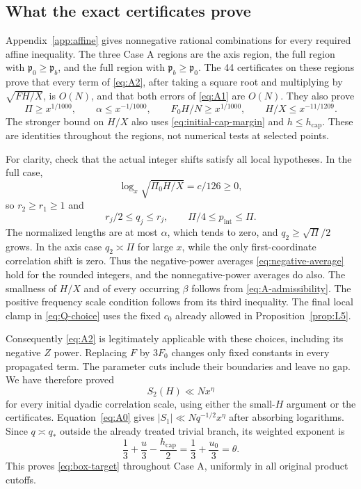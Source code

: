 \documentclass[11pt,a4paper]{article}
\numberwithin{equation}{section}
\theoremstyle{remark}
\newcommand{\pint}{p_{\mathrm{int}}}
\newcommand{\hcap}{h_{\mathrm{cap}}}
\newcommand{\Fzero}{F_0}
\begin{document}
\subsection{What the exact certificates prove}
Appendix~\ref{app:affine} gives nonnegative rational combinations for every
required affine inequality. The three Case A regions are the axis region,
the full region with $\mathfrak p_0\ge\mathfrak p_b$, and the full region
with $\mathfrak p_b\ge\mathfrak p_0$. The 44 certificates on these regions
prove that every term of \eqref{eq:A2}, after taking a square root and
multiplying by $\sqrt{FH/X}$, is $O(N)$, and that both errors of
\eqref{eq:A1} are $O(N)$. They also prove
\begin{equation}\label{eq:A-admissibility}
 \Pi\ge x^{1/1000},\qquad
 \alpha\le x^{-1/1000},\qquad
 \Fzero H/N\ge x^{1/1000},\qquad H/X\le x^{-11/1209}.
\end{equation}
The stronger bound on $H/X$ also uses \eqref{eq:initial-cap-margin}
and $h\le\hcap$. These are identities throughout the regions, not
numerical tests at selected points.

For clarity, check that the actual integer shifts satisfy all local
hypotheses. In the full case,
\[
 \log_x\sqrt{\Pi_0H/X}=c/126\ge0,
\]
so $r_2\ge r_1\ge1$ and
\begin{equation}\label{eq:integer-product}
 r_j/2\le q_j\le r_j,\qquad \Pi/4\le\pint\le\Pi.
\end{equation}
The normalized lengths are at most $\alpha$, which tends to zero, and
$q_2\ge\sqrt\Pi/2$ grows. In the axis case $q_2\asymp\Pi$ for large $x$,
while the only first-coordinate correlation shift is zero. Thus the
negative-power averages \eqref{eq:negative-average} hold for the rounded
integers, and the nonnegative-power averages do also. The smallness of
$H/X$ and of every occurring $\beta$ follows from
\eqref{eq:A-admissibility}. The positive frequency scale condition follows
from its third inequality. The final local clamp in \eqref{eq:Q-choice}
uses the fixed $c_0$ already allowed in Proposition~\ref{prop:L5}.

Consequently \eqref{eq:A2} is legitimately applicable with these choices,
including its negative $Z$ power. Replacing $F$ by $3\Fzero$ changes only
fixed constants in every propagated term. The parameter cuts include their
boundaries and leave no gap. We have therefore proved
\[
 S_2(H)\ll Nx^\eta
\]
for every initial dyadic correlation scale, using either the small-$H$
argument or the certificates. Equation~\eqref{eq:A0} gives
$|S_1|\ll Nq^{-1/2}x^\eta$ after absorbing logarithms. Since $q\asymp q_*$
outside the already treated trivial branch, its weighted exponent is
\begin{equation}\label{eq:caseA-final}
 \frac13+\frac u3-\frac{\hcap}{2}
       =\frac13+\frac{u_0}{3}=\theta.
\end{equation}
This proves \eqref{eq:box-target} throughout Case A, uniformly in all
original product cutoffs.
\end{document}
